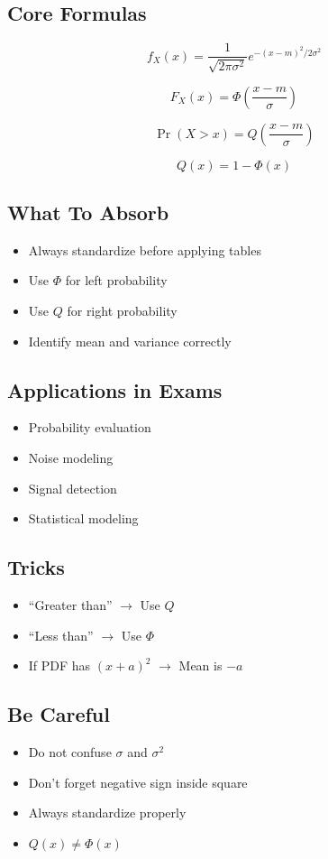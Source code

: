 \documentclass[11pt]{article}
\begin{document}
\subsection*{Core Formulas}

\[
f_X(x)=
\frac{1}{\sqrt{2\pi\sigma^2}}
e^{-(x-m)^2/2\sigma^2}
\]

\[
F_X(x)=
\Phi
\left(
\frac{x-m}{\sigma}
\right)
\]

\[
\Pr(X>x)=
Q
\left(
\frac{x-m}{\sigma}
\right)
\]

\[
Q(x)=1-\Phi(x)
\]

\subsection*{What To Absorb}

\begin{itemize}
    \item Always standardize before applying tables
    \item Use $\Phi$ for left probability
    \item Use $Q$ for right probability
    \item Identify mean and variance correctly
\end{itemize}

\subsection*{Applications in Exams}

\begin{itemize}
    \item Probability evaluation
    \item Noise modeling
    \item Signal detection
    \item Statistical modeling
\end{itemize}

\subsection*{Tricks}

\begin{itemize}
    \item “Greater than” $\rightarrow$ Use $Q$
    \item “Less than” $\rightarrow$ Use $\Phi$
    \item If PDF has $(x+a)^2$ $\rightarrow$ Mean is $-a$
\end{itemize}

\subsection*{Be Careful}

\begin{itemize}
    \item Do not confuse $\sigma$ and $\sigma^2$
    \item Don’t forget negative sign inside square
    \item Always standardize properly
    \item $Q(x) \neq \Phi(x)$
\end{itemize}

\end{document}
